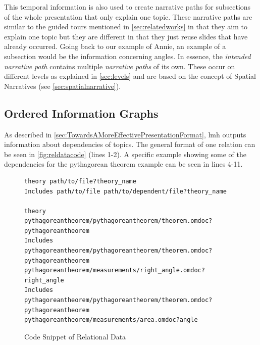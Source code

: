 \documentclass[twoside, 12pt]{article}
\begin{document}
This temporal information is also used to create narrative paths for subsections of the whole presentation that only explain one topic. These narrative paths are similar to the guided tours mentioned in \autoref{sec:relatedworks} in that they aim to explain one topic but they are different in that they just reuse slides that have already occurred. Going back to our example of Annie, an example of a subsection would be the information concerning angles. In essence, the \textit{intended narrative path} contains multiple \textit{narrative paths} of its own. These occur on different levels as explained in \autoref{sec:levels} and are based on the concept of Spatial Narratives (see \autoref{sec:spatialnarrative}).

\subsection{Ordered Information Graphs}
\label{sec:orderedInfoGraphs}

As described in \autoref{sec:TowardsAMoreEffectivePresentationFormat}, lmh outputs information about dependencies of topics. The general format of one relation can be seen in \autoref{fig:reldatacode} (lines 1-2). A specific example showing some of the dependencies for the pythagorean theorem example can be seen in lines 4-11.\\

\begin{figure}
\vspace{-0pt}
\begin{verbatim}
theory path/to/file?theory_name
Includes path/to/file path/to/dependent/file?theory_name

theory 
pythagoreantheorem/pythagoreantheorem/theorem.omdoc?pythagoreantheorem
Includes 
pythagoreantheorem/pythagoreantheorem/theorem.omdoc?pythagoreantheorem
pythagoreantheorem/measurements/right_angle.omdoc?right_angle
Includes 
pythagoreantheorem/pythagoreantheorem/theorem.omdoc?pythagoreantheorem
pythagoreantheorem/measurements/area.omdoc?angle
\end{verbatim}
\vspace{-5pt}
  \caption[Caption for LOF]{Code Snippet of Relational Data \footnotemark}
  \label{fig:reldatacode}
  \vspace{12pt}
\end{figure}

\begin{figure}
\vspace{-50pt}
\end{figure}
\end{document}
